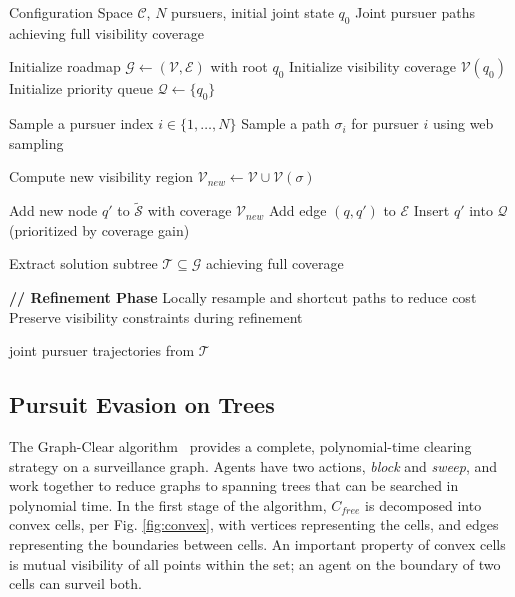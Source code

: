 \documentclass[conference]{IEEEtran}
\begin{document}
\begin{algorithm}[h]
	\caption{Visibility Roadmap Sampling for Multi-Pursuer Pursuit-Evasion} \label{alg:visibility_roadmap}
	\begin{algorithmic}[1]
		\Require Configuration Space $\mathcal{C}$, $N$ pursuers, initial joint state $q_0$
		\Ensure Joint pursuer paths achieving full visibility coverage
		
		\State Initialize roadmap $\mathcal{G} \gets (\mathcal{V}, \mathcal{E})$ with root $q_0$
		\State Initialize visibility coverage $\mathcal{V}(q_0)$
		\State Initialize priority queue $\mathcal{Q} \gets \{q_0\}$
		\color{black}
		
		\State Sample a pursuer index $i \in \{1,\dots,N\}$
		\State Sample a path $\sigma_i$ for pursuer $i$ using web sampling
		\color{black}
		
		\State Compute new visibility region $\mathcal{V}_{new} \gets \mathcal{V} \cup \mathcal{V}(\sigma)$
		
		\State Add new node $q'$ to $\mathcal{\tilde{S}}$ with coverage $\mathcal{V}_{new}$
		\State Add edge $(q, q')$ to $\mathcal{E}$
		\State Insert $q'$ into $\mathcal{Q}$ (prioritized by coverage gain)
		\EndIf
		\EndWhile
		
		\State Extract solution subtree $\mathcal{T} \subseteq \mathcal{G}$ achieving full coverage
		
		\State \textbf{// Refinement Phase}
		\State Locally resample and shortcut paths to reduce cost
		\State Preserve visibility constraints during refinement
		\EndFor
		\color{black}
		
		\State \Return joint pursuer trajectories from $\mathcal{T}$
	\end{algorithmic}
\end{algorithm}



\subsection{Pursuit Evasion on Trees}
The Graph-Clear algorithm~\cite{kolling2009pursuit} provides a complete,
polynomial-time clearing strategy on a surveillance graph. Agents have two actions, \textit{block} and \textit{sweep}, and work together to reduce graphs to spanning trees that can be searched in polynomial time. In the first stage of the algorithm, $C_{free}$ is decomposed into convex cells, per Fig. \ref{fig:convex}, with vertices representing the cells, and edges representing the boundaries between cells. An important property of convex cells is mutual visibility of all points within the set; an agent on the boundary of two cells can surveil both.
\end{document}

